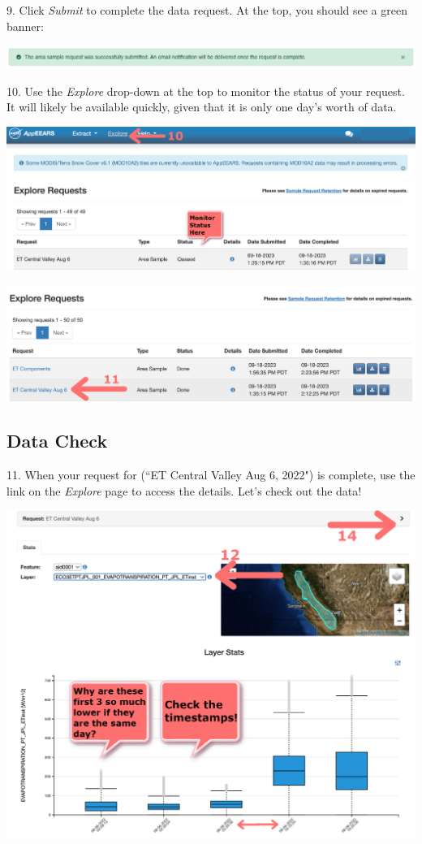 \documentclass[oneside,a4paper,11pt,explicit]{book}
\begin{document}
9. Click \textit{Submit} to complete the data request. At the top, you should see a green banner:

\vspace{.5em}

\centerline{\includegraphics[width=\textwidth]{RequestSuccess.png}}

\vspace{.5em}

10. Use the \textit{Explore} drop-down at the top to monitor the status of your request. It will likely be available quickly, given that it is only one day's worth of data.

\vspace{.5em}

\centerline{\includegraphics[width=.75\textwidth]{ExploreRequest.png}}

\vspace{.5em}

\centerline{\includegraphics[width=.6\textwidth]{ExploreComplete.png}}

\vspace{.5em}

\subsection{Data Check}

11. When your request for (``ET Central Valley Aug 6, 2022") is complete, use the link on the \textit{Explore} page to access the details. Let's check out the data!

\vspace{.5em}

\centerline{\includegraphics[width=.6\textwidth]{ETinstDataCheck.png}}
\end{document}
